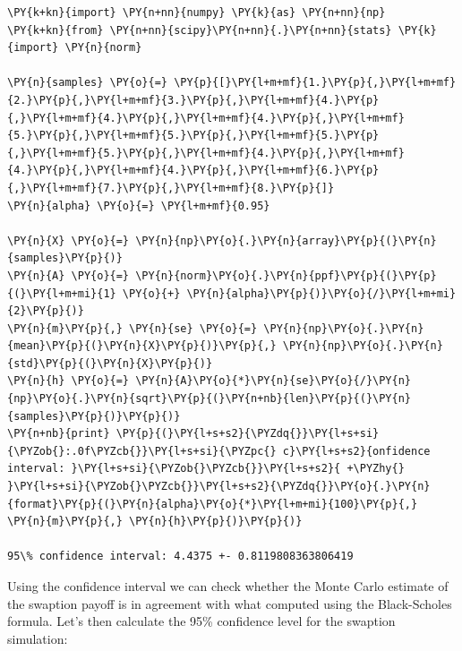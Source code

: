 \begin{tcolorbox}[breakable, size=fbox, boxrule=1pt, pad at break*=1mm,colback=cellbackground, colframe=cellborder]
\begin{Verbatim}[commandchars=\\\{\}]
\PY{k+kn}{import} \PY{n+nn}{numpy} \PY{k}{as} \PY{n+nn}{np}
\PY{k+kn}{from} \PY{n+nn}{scipy}\PY{n+nn}{.}\PY{n+nn}{stats} \PY{k}{import} \PY{n}{norm}
		
\PY{n}{samples} \PY{o}{=} \PY{p}{[}\PY{l+m+mf}{1.}\PY{p}{,}\PY{l+m+mf}{2.}\PY{p}{,}\PY{l+m+mf}{3.}\PY{p}{,}\PY{l+m+mf}{4.}\PY{p}{,}\PY{l+m+mf}{4.}\PY{p}{,}\PY{l+m+mf}{4.}\PY{p}{,}\PY{l+m+mf}{5.}\PY{p}{,}\PY{l+m+mf}{5.}\PY{p}{,}\PY{l+m+mf}{5.}\PY{p}{,}\PY{l+m+mf}{5.}\PY{p}{,}\PY{l+m+mf}{4.}\PY{p}{,}\PY{l+m+mf}{4.}\PY{p}{,}\PY{l+m+mf}{4.}\PY{p}{,}\PY{l+m+mf}{6.}\PY{p}{,}\PY{l+m+mf}{7.}\PY{p}{,}\PY{l+m+mf}{8.}\PY{p}{]}
\PY{n}{alpha} \PY{o}{=} \PY{l+m+mf}{0.95}
		
\PY{n}{X} \PY{o}{=} \PY{n}{np}\PY{o}{.}\PY{n}{array}\PY{p}{(}\PY{n}{samples}\PY{p}{)}
\PY{n}{A} \PY{o}{=} \PY{n}{norm}\PY{o}{.}\PY{n}{ppf}\PY{p}{(}\PY{p}{(}\PY{l+m+mi}{1} \PY{o}{+} \PY{n}{alpha}\PY{p}{)}\PY{o}{/}\PY{l+m+mi}{2}\PY{p}{)}
\PY{n}{m}\PY{p}{,} \PY{n}{se} \PY{o}{=} \PY{n}{np}\PY{o}{.}\PY{n}{mean}\PY{p}{(}\PY{n}{X}\PY{p}{)}\PY{p}{,} \PY{n}{np}\PY{o}{.}\PY{n}{std}\PY{p}{(}\PY{n}{X}\PY{p}{)}
\PY{n}{h} \PY{o}{=} \PY{n}{A}\PY{o}{*}\PY{n}{se}\PY{o}{/}\PY{n}{np}\PY{o}{.}\PY{n}{sqrt}\PY{p}{(}\PY{n+nb}{len}\PY{p}{(}\PY{n}{samples}\PY{p}{)}\PY{p}{)}
\PY{n+nb}{print} \PY{p}{(}\PY{l+s+s2}{\PYZdq{}}\PY{l+s+si}{\PYZob{}:.0f\PYZcb{}}\PY{l+s+si}{\PYZpc{} c}\PY{l+s+s2}{onfidence interval: }\PY{l+s+si}{\PYZob{}\PYZcb{}}\PY{l+s+s2}{ +\PYZhy{} }\PY{l+s+si}{\PYZob{}\PYZcb{}}\PY{l+s+s2}{\PYZdq{}}\PY{o}{.}\PY{n}{format}\PY{p}{(}\PY{n}{alpha}\PY{o}{*}\PY{l+m+mi}{100}\PY{p}{,} \PY{n}{m}\PY{p}{,} \PY{n}{h}\PY{p}{)}\PY{p}{)}
		
95\% confidence interval: 4.4375 +- 0.8119808363806419
\end{Verbatim}
\end{tcolorbox}

Using the confidence interval we can check whether the Monte Carlo estimate of the swaption payoff is in agreement with what computed using the Black-Scholes formula.
Let's then calculate the 95\% confidence level for the swaption simulation:

